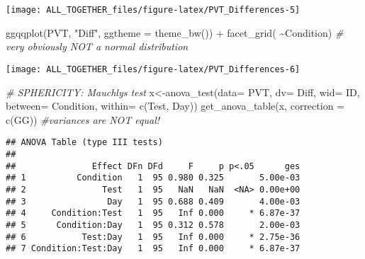 \documentclass[
]{article}
\newenvironment{Shaded}{\begin{snugshade}}{\end{snugshade}}
\newcommand{\AttributeTok}[1]{\textcolor[rgb]{0.77,0.63,0.00}{#1}}
\newcommand{\CommentTok}[1]{\textcolor[rgb]{0.56,0.35,0.01}{\textit{#1}}}
\newcommand{\FunctionTok}[1]{\textcolor[rgb]{0.00,0.00,0.00}{#1}}
\newcommand{\NormalTok}[1]{#1}
\newcommand{\OtherTok}[1]{\textcolor[rgb]{0.56,0.35,0.01}{#1}}
\newcommand{\SpecialCharTok}[1]{\textcolor[rgb]{0.00,0.00,0.00}{#1}}
\newcommand{\StringTok}[1]{\textcolor[rgb]{0.31,0.60,0.02}{#1}}
\begin{document}
\texttt{[image: ALL\_TOGETHER\_files/figure-latex/PVT\_Differences-5]}

\begin{Shaded}
\begin{Highlighting}[]
\FunctionTok{ggqqplot}\NormalTok{(PVT, }\StringTok{"Diff"}\NormalTok{, }\AttributeTok{ggtheme =} \FunctionTok{theme\_bw}\NormalTok{()) }\SpecialCharTok{+}
  \FunctionTok{facet\_grid}\NormalTok{( }\SpecialCharTok{\textasciitilde{}}\NormalTok{Condition) }\CommentTok{\#  very obviously NOT a normal distribution}
\end{Highlighting}
\end{Shaded}

\texttt{[image: ALL\_TOGETHER\_files/figure-latex/PVT\_Differences-6]}

\begin{Shaded}
\begin{Highlighting}[]
\CommentTok{\# SPHERICITY: Mauchly\textquotesingle{}s test}
\NormalTok{x}\OtherTok{\textless{}{-}}\FunctionTok{anova\_test}\NormalTok{(}\AttributeTok{data=}\NormalTok{ PVT, }\AttributeTok{dv=}\NormalTok{ Diff, }\AttributeTok{wid=}\NormalTok{ ID, }\AttributeTok{between=}\NormalTok{ Condition, }\AttributeTok{within=} \FunctionTok{c}\NormalTok{(Test, Day))}
\FunctionTok{get\_anova\_table}\NormalTok{(x, }\AttributeTok{correction =} \FunctionTok{c}\NormalTok{(}\StringTok{\textquotesingle{}GG\textquotesingle{}}\NormalTok{)) }\CommentTok{\#variances are NOT equal!}
\end{Highlighting}
\end{Shaded}

\begin{verbatim}
## ANOVA Table (type III tests)
## 
##               Effect DFn DFd     F     p p<.05      ges
## 1          Condition   1  95 0.980 0.325       5.00e-03
## 2               Test   1  95   NaN   NaN  <NA> 0.00e+00
## 3                Day   1  95 0.688 0.409       4.00e-03
## 4     Condition:Test   1  95   Inf 0.000     * 6.87e-37
## 5      Condition:Day   1  95 0.312 0.578       2.00e-03
## 6           Test:Day   1  95   Inf 0.000     * 2.75e-36
## 7 Condition:Test:Day   1  95   Inf 0.000     * 6.87e-37
\end{verbatim}

\begin{Shaded}
\end{Shaded}
\end{document}
